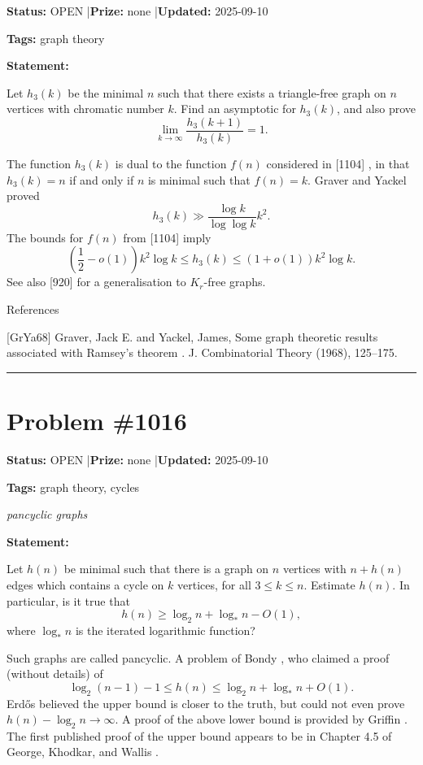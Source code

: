 \documentclass{article}
\begin{document}
\noindent\textbf{Status:} OPEN \quad|\quad \textbf{Prize:} none \quad|\quad \textbf{Updated:} 2025-09-10

\noindent\textbf{Tags:} graph theory

\medskip

\noindent\textbf{Statement:}

Let $h_3(k)$ be the minimal $n$ such that there exists a triangle-free graph on $n$ vertices with chromatic number $k$. Find an asymptotic for $h_3(k)$, and also prove\[\lim_{k\to \infty}\frac{h_3(k+1)}{h_3(k)}=1.\]




The function $h_3(k)$ is dual to the function $f(n)$ considered in [1104] , in that $h_3(k)= n$ if and only if $n$ is minimal such that $f(n)=k$. Graver and Yackel \cite{GrYa68} proved\[h_3(k)\gg \frac{\log k}{\log\log k}k^2.\]The bounds for $f(n)$ from [1104] imply\[\left(\frac{1}{2}-o(1)\right)k^2\log k\leq h_3(k) \leq (1+o(1))k^2\log k.\]See also [920] for a generalisation to $K_r$-free graphs.




References

[GrYa68] Graver, Jack E. and Yackel, James, Some graph theoretic results associated with Ramsey's theorem . J. Combinatorial Theory (1968), 125--175.

\noindent\rule{\linewidth}{0.4pt}


\section{Problem \#1016}
\label{prob:1016}

\noindent\textbf{Status:} OPEN \quad|\quad \textbf{Prize:} none \quad|\quad \textbf{Updated:} 2025-09-10

\noindent\textbf{Tags:} graph theory, cycles

\medskip
\noindent\textit{pancyclic graphs}


\noindent\textbf{Statement:}

Let $h(n)$ be minimal such that there is a graph on $n$ vertices with $n+h(n)$ edges which contains a cycle on $k$ vertices, for all $3\leq k\leq n$. Estimate $h(n)$. In particular, is it true that\[h(n) \geq \log_2n+\log_*n-O(1),\]where $\log_*n$ is the iterated logarithmic function?




Such graphs are called pancyclic. A problem of Bondy \cite{Bo71}, who claimed a proof (without details) of\[\log_2(n-1)-1\leq h(n) \leq \log_2n+\log_*n+O(1).\]Erd\H{o}s \cite{Er71} believed the upper bound is closer to the truth, but could not even prove $h(n)-\log_2n\to \infty$. A proof of the above lower bound is provided by Griffin \cite{Gr13}. The first published proof of the upper bound appears to be in Chapter 4.5 of George, Khodkar, and Wallis \cite{GKW16}.
\end{document}
